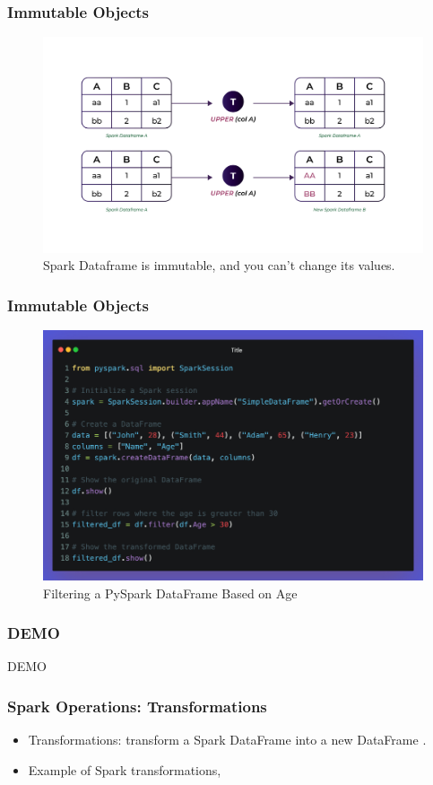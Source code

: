 \begin{frame}
    \frametitle{Immutable Objects}
    \begin{figure}
        \includegraphics[width=\textwidth,height=.7\textheight,keepaspectratio]{./Figures/chapter-04/Immutable_df}
        \caption{Spark Dataframe is immutable, and you can't change its values.}\label{fig:Immutable_df}
    \end{figure}
\end{frame}

\begin{frame}[fragile]
    \frametitle{Immutable Objects}
    \begin{figure}
    \includegraphics[width=\textwidth,height=.75\textheight,keepaspectratio]{./Figures/chapter-04/pyspark_immutable_df}
    \caption{Filtering a PySpark DataFrame Based on Age}\label{fig:pyspark_immutable_df}
    \end{figure}
\end{frame}
\begin{frame}[fragile]
    \frametitle{DEMO}
   DEMO
\end{frame}
\begin{frame}
    \frametitle{Spark Operations: Transformations}
    \begin{itemize}
        \item Transformations: transform a Spark DataFrame into a new DataFrame \textit{\color{blue}{without altering the original data}}.
        \item Example of Spark transformations, \texttt{\color{orange}{map(), select(), filter(), or drop()} }
    \end{itemize}
\end{frame}


